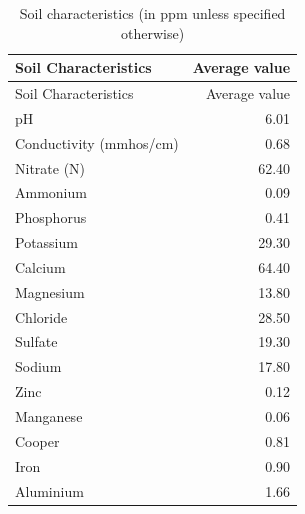 \documentclass[11pt,]{article}
\begin{document}
\begin{longtable}[]{@{}lr@{}}
\caption{Soil characteristics (in ppm unless specified
otherwise)}\tabularnewline
\toprule
Soil Characteristics & Average value\tabularnewline
\midrule
\endfirsthead
\toprule
Soil Characteristics & Average value\tabularnewline
\midrule
\endhead
pH & 6.01\tabularnewline
Conductivity (mmhos/cm) & 0.68\tabularnewline
Nitrate (N) & 62.40\tabularnewline
Ammonium & 0.09\tabularnewline
Phosphorus & 0.41\tabularnewline
Potassium & 29.30\tabularnewline
Calcium & 64.40\tabularnewline
Magnesium & 13.80\tabularnewline
Chloride & 28.50\tabularnewline
Sulfate & 19.30\tabularnewline
Sodium & 17.80\tabularnewline
Zinc & 0.12\tabularnewline
Manganese & 0.06\tabularnewline
Cooper & 0.81\tabularnewline
Iron & 0.90\tabularnewline
Aluminium & 1.66\tabularnewline
\bottomrule
\end{longtable}
\end{document}
